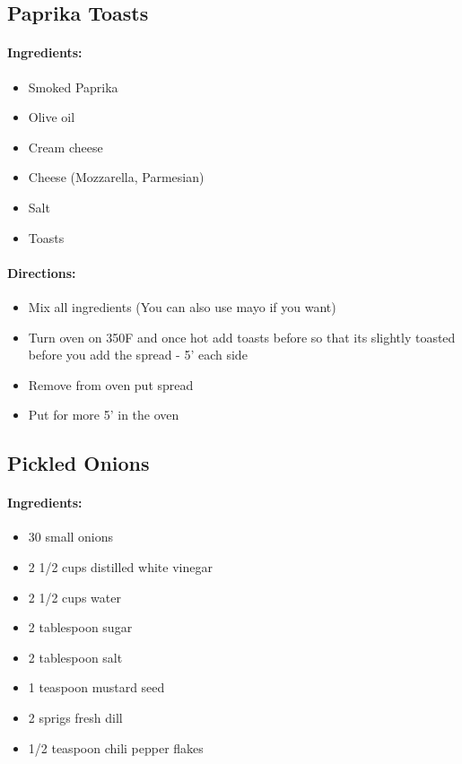 \documentclass{article}
\begin{document}
\subsection{Paprika Toasts}

\paragraph{Ingredients:}
\begin{itemize}
    \item Smoked Paprika
    \item Olive oil
    \item Cream cheese
    \item Cheese (Mozzarella, Parmesian)
    \item Salt
    \item Toasts
\end{itemize}

\paragraph{Directions:}
\begin{itemize}
    \item Mix all ingredients (You can also use mayo if you want)
    \item Turn oven on 350F and once hot add toasts before so that its slightly toasted before you add the spread - 5' each side
    \item Remove from oven put spread
    \item Put for more 5' in the oven
\end{itemize}

\subsection{Pickled Onions}

\paragraph{Ingredients:}
\begin{itemize}
    \item 30 small onions
    \item 2 1/2 cups distilled white vinegar
    \item 2 1/2 cups water
    \item 2 tablespoon sugar
    \item 2 tablespoon salt
    \item 1 teaspoon mustard seed
    \item 2 sprigs fresh dill
    \item 1/2 teaspoon chili pepper flakes
\end{itemize}
\end{document}
